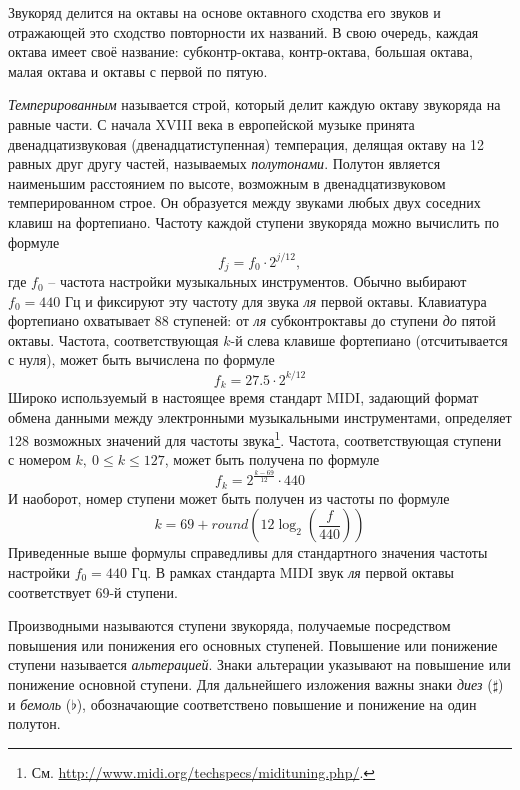 Звукоряд делится на октавы на основе октавного сходства его звуков и отражающей
это сходство повторности их названий. В свою очередь, каждая октава имеет своё
название: субконтр-октава, контр-октава, большая октава, малая октава и октавы с
первой по пятую.

\emph{Темперированным} называется строй, который делит каждую октаву звукоряда
на равные части. С начала XVIII века в европейской музыке принята
двенадцатизвуковая (двенадцатиступенная) темперация, делящая октаву на 12 равных
друг другу частей, называемых \emph{полутонами}. Полутон является наименьшим
расстоянием по высоте, возможным в двенадцатизвуковом темперированном строе. Он
образуется между звуками любых двух соседних клавиш на фортепиано. Частоту
каждой ступени звукоряда можно вычислить по формуле
\begin{equation}
\label{eq:note_freq}
f_j = f_0 \cdot 2^{j/12},
\end{equation}
где $f_0$ -- частота настройки музыкальных инструментов. Обычно выбирают $f_0 =
440$ Гц и фиксируют эту частоту для звука \emph{ля} первой октавы. Клавиатура
фортепиано охватывает 88 ступеней: от \emph{ля} субконтроктавы до
ступени \emph{до} пятой октавы. Частота, соответствующая $k$-й слева клавише
фортепиано (отсчитывается с нуля), может быть вычислена по формуле
$$f_k = 27.5 \cdot 2^{k/12}$$
Широко используемый в настоящее время стандарт MIDI, задающий формат обмена
данными между электронными музыкальными инструментами, определяет 128 возможных
значений для частоты звука\footnote{См.
\url{http://www.midi.org/techspecs/midituning.php/}.}. Частота, соответствующая
ступени с номером $k,~0 \leq k \leq 127$, может быть получена по формуле
$$f_k = 2^{\frac{k - 69}{12}} \cdot 440$$
И наоборот, номер ступени может быть получен из частоты по формуле
\begin{equation}
\label{eq:fton}
k = 69 + round \left( 12 \log_2 \left( \frac{f}{440} \right) \right)
\end{equation}
Приведенные выше формулы справедливы для стандартного значения частоты
настройки $f_0 = 440$ Гц. В рамках стандарта MIDI звук \emph{ля} первой октавы
соответствует 69-й ступени.

Производными называются ступени звукоряда, получаемые посредством повышения или
понижения его основных ступеней. Повышение или понижение ступени называется
\emph{альтерацией}. Знаки альтерации указывают на повышение или понижение
основной ступени. Для дальнейшего изложения важны знаки \emph{диез} ($\sharp$) и
\emph{бемоль} ($\flat$), обозначающие соответствено повышение и понижение на
один полутон.

